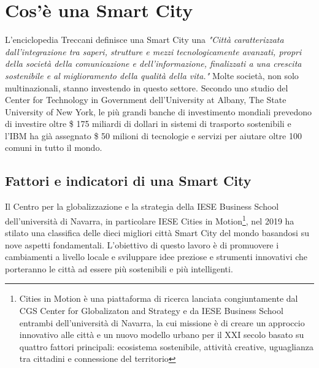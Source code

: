 \chapter{Cos'è una Smart City}
L'enciclopedia Treccani definisce una Smart City una \textit{"Città caratterizzata dall’integrazione tra saperi, strutture e mezzi tecnologicamente avanzati, propri della società della comunicazione e dell’informazione, finalizzati a una crescita sostenibile e al miglioramento della qualità della vita."}\cite{definizione_smart_city}
Molte società, non solo multinazionali, stanno investendo in questo settore. Secondo uno studio del Center for Technology in Government dell'University at Albany, The State University of New York, le più grandi banche di investimento mondiali prevedono di investire oltre \$ 175 miliardi di dollari in sistemi di trasporto sostenibili e l'IBM ha già assegnato \$ 50 milioni  di tecnologie e servizi per aiutare oltre 100 comuni in tutto il mondo.\cite{What_make_city_smart}

\section{Fattori e indicatori di una Smart City}
Il Centro per la globalizzazione e la strategia della IESE Business School dell'università di Navarra, in particolare IESE Cities in Motion\footnote{Cities in Motion è una piattaforma di ricerca lanciata congiuntamente dal CGS Center for Globalizaton and Strategy e da IESE Business School entrambi dell'università di Navarra, la cui missione è di creare un approccio innovativo alle città e un nuovo modello urbano per il XXI secolo basato su quattro fattori principali: ecosistema sostenibile, attività creative, uguaglianza tra cittadini e connessione del territorio}, nel 2019 ha stilato una classifica delle dieci migliori città Smart City del mondo basandosi su nove aspetti fondamentali.\cite{iese_cities_2019}
L'obiettivo di questo lavoro è di promuovere i cambiamenti a livello locale e sviluppare idee preziose e strumenti innovativi che porteranno le città ad essere più sostenibili e più intelligenti. 


